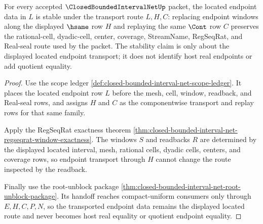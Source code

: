 \begin{theorem}
\label{thm:closed-bounded-interval-net-located-endpoint-stability}
For every accepted $\ClosedBoundedIntervalNetUp$ packet, the located endpoint data in $L$ is stable under the transport route $L,H,C$: replacing endpoint windows along the displayed $\hsame$ row $H$ and replaying the same $\Cont$ row $C$ preserves the rational-cell, dyadic-cell, center, coverage, StreamName, RegSeqRat, and Real-seal route used by the packet. The stability claim is only about the displayed located endpoint transport; it does not identify host real endpoints or add quotient equality.
\end{theorem}
\begin{proof}
Use the scope ledger \autoref{def:closed-bounded-interval-net-scope-ledger}. It places the located endpoint row $L$ before the mesh, cell, window, readback, and Real-seal rows, and assigns $H$ and $C$ as the componentwise transport and replay rows for that same family.

Apply the RegSeqRat exactness theorem \autoref{thm:closed-bounded-interval-net-regseqrat-window-exactness}. The windows $S$ and readbacks $R$ are determined by the displayed located interval, mesh, rational cells, dyadic cells, centers, and coverage rows, so endpoint transport through $H$ cannot change the route inspected by the readback.

Finally use the root-unblock package \autoref{thm:closed-bounded-interval-net-root-unblock-package}. Its handoff reaches compact-uniform consumers only through $E,H,C,P,N$, so the transported endpoint data remains the displayed located route and never becomes host real equality or quotient endpoint equality.
\end{proof}

